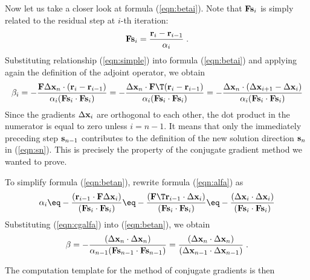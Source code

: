   Now let us take a closer look at formula (\ref{eqn:betai}). Note
  that $\bold F \bold s_i$ is simply related to the residual step at
  $i$-th iteration: 
  \begin{equation}
  \label{eqn:simple}
\bold F \bold s_i = \frac{\bold r_i - \bold
    r_{i-1}}{\alpha_i}\;.
  \end{equation}
  Substituting relationship (\ref{eqn:simple}) into formula
  (\ref{eqn:betai}) and applying again the definition of the adjoint
  operator, we obtain
\begin{equation}
  \label{eqn:betan}  
   \beta_i = 
  - \frac{ \bold F \Delta \bold x_n \cdot (\bold r_i - \bold r_{i-1})}
  {\alpha_i (\bold F \bold s_i \cdot \bold F \bold s_i )} =
  - \frac{\Delta \bold x_n \cdot \bold F\T (\bold r_i - \bold r_{i-1})}
  {\alpha_i (\bold F \bold s_i \cdot \bold F \bold s_i )} =
  - \frac{ \Delta \bold x_n \cdot (\Delta \bold x_{i+1} - \Delta \bold x_i)}
  {\alpha_i (\bold F \bold s_i \cdot \bold F \bold s_i )} 
\end{equation}
Since the gradients $\Delta \bold x_i$ are orthogonal to each other,
the dot product in the numerator is equal to zero unless $i = n-1$. It
means that only the immediately preceding step $\bold s_{n-1}$
contributes to the definition of the new solution direction $\bold
s_n$ in (\ref{eqn:sn}). This is precisely the property of the
conjugate gradient method we wanted to prove.
\par
To simplify formula (\ref{eqn:betan}), rewrite formula (\ref{eqn:alfa}) as
\begin{equation}
  \label{eqn:cgalfa}
  \alpha_i \eq - \frac 
  { (\bold r_{i-1} \cdot \bold F \Delta \bold x_i )}
  {( \bold F \bold s_i \cdot \bold F \bold s_i ) } \eq - \frac
  { (\bold F\T \bold r_{i-1} \cdot \Delta \bold x_i )}
  {( \bold F \bold s_i \cdot \bold F \bold s_i ) } \eq - \frac
  { (\Delta \bold x_i \cdot \Delta \bold x_i )}
  {( \bold F \bold s_i \cdot \bold F \bold s_i ) }
\end{equation}
Substituting (\ref{eqn:cgalfa}) into (\ref{eqn:betan}), we obtain 
\begin{equation}
  \label{eqn:cgbeta}  
   \beta = 
  - \frac{( \Delta \bold x_n \cdot \Delta \bold x_n)}
  {\alpha_{n-1} (\bold F \bold s_{n-1} \cdot \bold F \bold s_{n-1} )} =
  \frac{(\Delta \bold x_n \cdot \Delta \bold x_n)}
  {(\Delta \bold x_{n-1} \cdot \Delta \bold x_{n-1})}\;.
\end{equation}
\par
The computation template for the method of conjugate gradients is then
